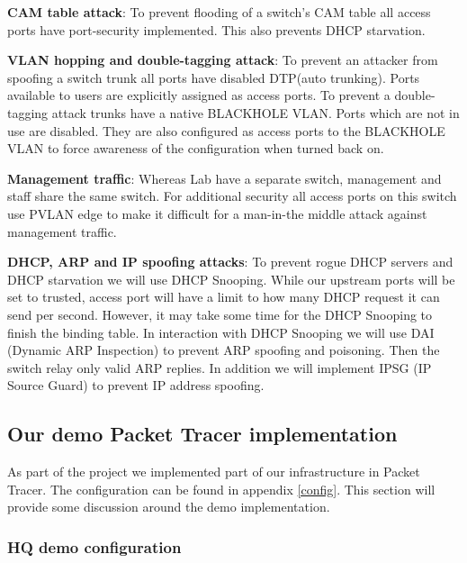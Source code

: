 \textbf{CAM table attack}: To prevent flooding of a switch's CAM table all access ports have port-security implemented. This also prevents DHCP starvation.

\textbf{VLAN hopping and double-tagging attack}: To prevent an attacker from spoofing a switch trunk all ports have disabled DTP(auto trunking). Ports available to users are explicitly assigned as access ports. To prevent a double-tagging attack trunks have a native BLACKHOLE VLAN. Ports which are not in use are disabled. They are also configured as access ports to the BLACKHOLE VLAN to force awareness of the configuration when turned back on.

\textbf{Management traffic}: Whereas Lab have a separate switch, management and staff share the same switch. For additional security all access ports on this switch use PVLAN edge to make it difficult for a man-in-the middle attack against management traffic.

\textbf{DHCP, ARP and IP spoofing attacks}: To prevent rogue DHCP servers and DHCP starvation we will use DHCP Snooping. While our upstream ports will be set to trusted, access port will have a limit to how many DHCP request it can send per second. However, it may take some time for the DHCP Snooping to finish the binding table. In interaction with DHCP Snooping we will use DAI (Dynamic ARP Inspection) to prevent ARP spoofing and poisoning. Then the switch relay only valid ARP replies. In addition we will implement IPSG (IP Source Guard) to prevent IP address spoofing.


\subsection{Our demo Packet Tracer implementation}


As part of the project we implemented part of our infrastructure in Packet Tracer. The configuration can be found in appendix \ref{config}. This section will provide some discussion around the demo implementation.

\subsubsection{HQ demo configuration}

